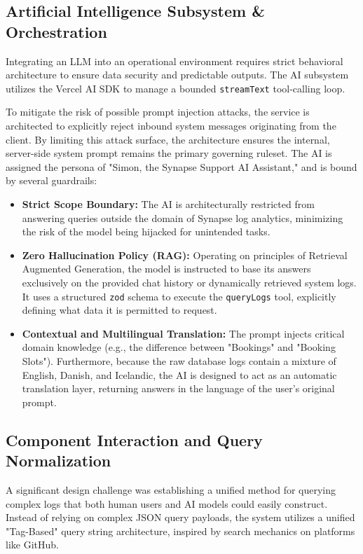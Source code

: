\subsection{Artificial Intelligence Subsystem \& Orchestration}
Integrating an LLM into an operational environment requires strict behavioral architecture to ensure data security and predictable outputs. The AI subsystem utilizes the Vercel AI SDK to manage a bounded \texttt{streamText} tool-calling loop.

To mitigate the risk of possible prompt injection attacks, the service is architected to explicitly reject inbound system messages originating from the client. By limiting this attack surface, the architecture ensures the internal, server-side system prompt remains the primary governing ruleset. The AI is assigned the persona of "Simon, the Synapse Support AI Assistant," and is bound by several guardrails:
\begin{itemize}
    \item \textbf{Strict Scope Boundary:} The AI is architecturally restricted from answering queries outside the domain of Synapse log analytics, minimizing the risk of the model being hijacked for unintended tasks.
    \item \textbf{Zero Hallucination Policy (RAG):} Operating on principles of Retrieval Augmented Generation, the model is instructed to base its answers exclusively on the provided chat history or dynamically retrieved system logs. It uses a structured \texttt{zod} schema to execute the \texttt{queryLogs} tool, explicitly defining what data it is permitted to request.
    \item \textbf{Contextual and Multilingual Translation:} The prompt injects critical domain knowledge (e.g., the difference between "Bookings" and "Booking Slots"). Furthermore, because the raw database logs contain a mixture of English, Danish, and Icelandic, the AI is designed to act as an automatic translation layer, returning answers in the language of the user's original prompt.
\end{itemize}

\subsection{Component Interaction and Query Normalization}
A significant design challenge was establishing a unified method for querying complex logs that both human users and AI models could easily construct. Instead of relying on complex JSON query payloads, the system utilizes a unified "Tag-Based" query string architecture, inspired by search mechanics on platforms like GitHub.

